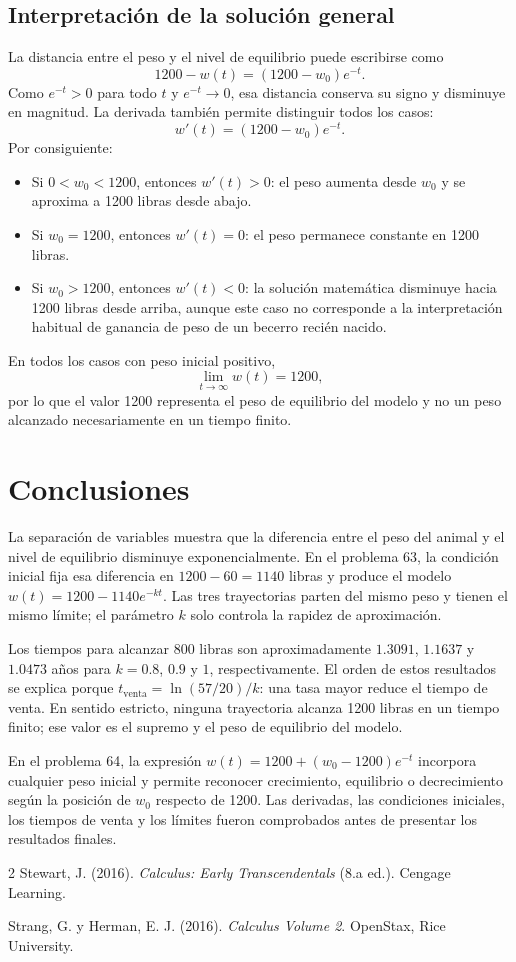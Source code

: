 \subsection{Interpretación de la solución general}
La distancia entre el peso y el nivel de equilibrio puede escribirse como
\[
 1200-w(t)=(1200-w_0)e^{-t}.
\]
Como $e^{-t}>0$ para todo $t$ y $e^{-t}\to0$, esa distancia conserva su signo y disminuye en magnitud. La derivada también permite distinguir todos los casos:
\[
 w'(t)=(1200-w_0)e^{-t}.
\]
Por consiguiente:
\begin{itemize}
 \item Si $0<w_0<1200$, entonces $w'(t)>0$: el peso aumenta desde $w_0$ y se aproxima a 1200 libras desde abajo.
 \item Si $w_0=1200$, entonces $w'(t)=0$: el peso permanece constante en 1200 libras.
 \item Si $w_0>1200$, entonces $w'(t)<0$: la solución matemática disminuye hacia 1200 libras desde arriba, aunque este caso no corresponde a la interpretación habitual de ganancia de peso de un becerro recién nacido.
\end{itemize}
En todos los casos con peso inicial positivo,
\[
 \lim_{t\to\infty}w(t)=1200,
\]
por lo que el valor 1200 representa el peso de equilibrio del modelo y no un peso alcanzado necesariamente en un tiempo finito.

\section{Conclusiones}
La separación de variables muestra que la diferencia entre el peso del animal y el nivel de equilibrio disminuye exponencialmente. En el problema 63, la condición inicial fija esa diferencia en $1200-60=1140$ libras y produce el modelo $w(t)=1200-1140e^{-kt}$. Las tres trayectorias parten del mismo peso y tienen el mismo límite; el parámetro $k$ solo controla la rapidez de aproximación.

Los tiempos para alcanzar 800 libras son aproximadamente $1.3091$, $1.1637$ y $1.0473$ años para $k=0.8$, $0.9$ y $1$, respectivamente. El orden de estos resultados se explica porque $t_{\mathrm{venta}}=\ln(57/20)/k$: una tasa mayor reduce el tiempo de venta. En sentido estricto, ninguna trayectoria alcanza 1200 libras en un tiempo finito; ese valor es el supremo y el peso de equilibrio del modelo.

En el problema 64, la expresión $w(t)=1200+(w_0-1200)e^{-t}$ incorpora cualquier peso inicial y permite reconocer crecimiento, equilibrio o decrecimiento según la posición de $w_0$ respecto de 1200. Las derivadas, las condiciones iniciales, los tiempos de venta y los límites fueron comprobados antes de presentar los resultados finales.

\begin{thebibliography}{2}
Stewart, J. (2016).
\textit{Calculus: Early Transcendentals} (8.a ed.). Cengage Learning.

Strang, G. y Herman, E. J. (2016).
\textit{Calculus Volume 2}. OpenStax, Rice University.
\end{thebibliography}
